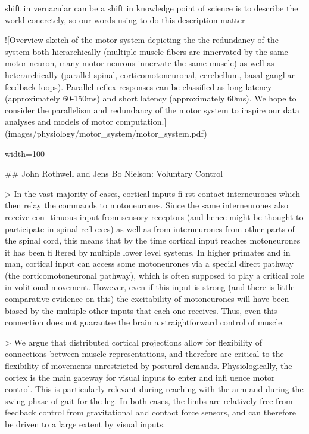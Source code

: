 \documentclass[../main.tex]{subfiles}
\begin{document}
{{shift in vernacular can be a shift in knowledge
point of science is to describe the world concretely, so our words using to do this description matter 

![Overview sketch of the motor system depicting the the redundancy of the system both hierarchically (multiple muscle fibers are innervated by the same motor neuron, many motor neurons innervate the same muscle) as well as heterarchically (parallel spinal, corticomotoneuronal, cerebellum, basal gangliar feedback loops). Parallel reflex responses can be classified as long latency (approximately 60-150ms) and short latency (approximately 60ms). We hope to consider the parallelism and redundancy of the motor system to inspire our data analyses and models of motor computation.](images/physiology/motor_system/motor_system.pdf){width=100%

## John Rothwell and Jens Bo Nielson: Voluntary Control

> In the vast majority of cases, cortical inputs fi rst contact interneurones which then relay the commands to motoneurones. Since the same interneurones also receive con -tinuous  input  from  sensory  receptors  (and  hence  might  be  thought  to  participate  in  spinal  refl exes) as well as from interneurones from other parts of the spinal cord, this means that by the  time  cortical  input  reaches  motoneurones  it  has  been  fi  ltered  by  multiple  lower  level  systems. In higher primates and in man, cortical input can access some motoneurones via a special direct pathway (the corticomotoneuronal pathway), which is often supposed to play a critical role in volitional movement. However, even if this input is strong (and there is little comparative evidence on this) the excitability of motoneurones will have been biased by the multiple other inputs that each one receives. Thus, even this connection does not guarantee the brain a straightforward control of muscle.

> We argue that distributed cortical projections allow for flexibility of connections between muscle representations, and therefore are critical to the flexibility of movements unrestricted by postural demands. Physiologically, the cortex is the main gateway for visual inputs to enter and infl uence motor control. This is particularly relevant during reaching with the arm and during the swing phase of gait for the leg. In both cases, the limbs are relatively free from feedback control from gravitational and contact force sensors, and can therefore be driven to a large extent by visual inputs.

}}}
\end{document}
